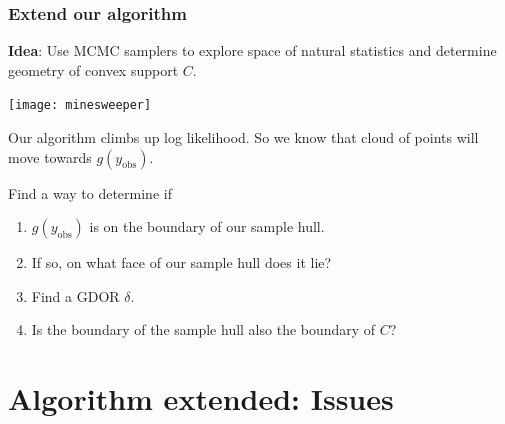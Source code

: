 \documentclass[ 10pt]{beamer}
\newcommand{\yobs}{y_{\text{obs}}}
\begin{document}
\frame
{
\frametitle{Extend our algorithm}  
\textbf{Idea}: Use MCMC samplers to explore space of natural statistics and
determine geometry of convex support $C$.
\vspace{2mm}
\pause

\texttt{[image: minesweeper]}
\vspace{2mm}

\pause
Our algorithm climbs up log likelihood.  So we know that cloud of points will move towards $g(\yobs)$.
\vspace{2mm}
\pause

Find a way to determine if
\begin{enumerate}
\item $g(\yobs)$ is on the boundary of our sample hull.
\item If so, on what face of our sample hull does it lie?
\item Find a GDOR $\delta$.
\item Is the boundary of the sample hull also the boundary of $C$?
\end{enumerate}
}

\section{Algorithm extended: Issues}
\end{document}
